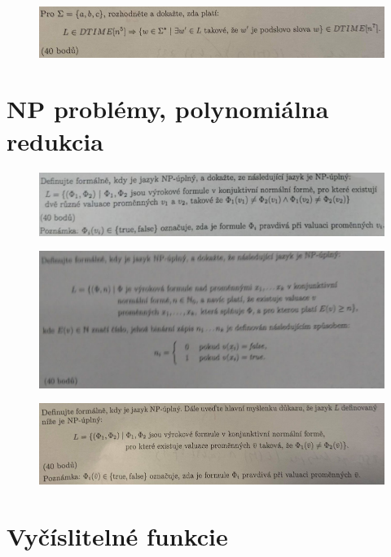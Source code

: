 \documentclass[]{article}
\begin{document}
	\begin{figure}[H]
		\includegraphics[width=\textwidth]{tasks/zlozitost/task7.png}
	\end{figure}

	\section{NP problémy, polynomiálna redukcia}
	
	\begin{figure}[H]
		\includegraphics[width=\textwidth]{tasks/np/task1.png}
	\end{figure}

	\begin{figure}[H]
		\includegraphics[width=\textwidth]{tasks/np/task2.png}
	\end{figure}
	
	\begin{figure}[H]
		\includegraphics[width=\textwidth]{tasks/np/task3.png}
	\end{figure}

	\section{Vyčíslitelné funkcie}
\end{document}
